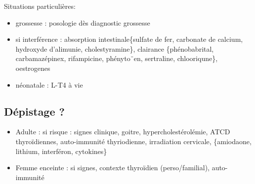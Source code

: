 \documentclass[11pt]{article}
\begin{document}
Situations particulières:
\begin{itemize}
\item grossesse : \inc posologie dès diagnostic grossesse
\item \inc si interférence : \dec absorption intestinale\{sulfate de fer, carbonate de calcium, hydroxyde
d'alimunie, cholestyramine\}, \inc clairance \{phénobabrital, carbamazépinex, rifampicine,
phényto¨en, sertraline, chlooriqune\}, oestrogenes
\item néonatale : L-T4 à vie
\end{itemize}

\subsection{Dépistage ?}
\label{sec:orgdc3f0fb}
\begin{itemize}
\item Adulte : si risque : signes clinique, goitre, hypercholestérolémie, ATCD
thyroïdiennes, auto-immunité thyriodienne, irradiation cervicale, \{amiodaone,
lithium, interféron, cytokines\}
\item Femme enceinte : si signes, contexte thyroïdien (perso/familial), auto-immunité
\end{itemize}
\end{document}
